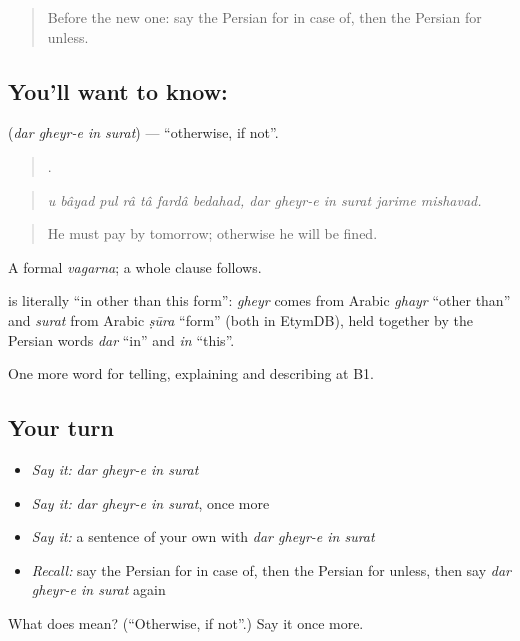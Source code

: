 \label{lesson:FA-C390-dar-gheyr-e-in-surat}



\begin{quote}
Before the new one: say the Persian for in case of, then the Persian for unless.
\end{quote}

\subsection*{You'll want to know:    }
\textbf{   } (\emph{dar gheyr-e in surat}) — \textquotedblleft{}otherwise, if not\textquotedblright{}.

\begin{quote}
            .
\end{quote}

\begin{quote}
\emph{u bâyad pul râ tâ fardâ bedahad, dar gheyr-e in surat jarime mishavad.}
\end{quote}

\begin{quote}
He must pay by tomorrow; otherwise he will be fined.
\end{quote}

A formal \emph{vagarna}; a whole clause follows.

\begin{cousinweb}
\textbf{   } is literally \textquotedblleft{}in other than this form\textquotedblright{}: \emph{gheyr} comes from Arabic \emph{ghayr} \textquotedblleft{}other than\textquotedblright{} and \emph{surat} from Arabic \emph{ṣūra} \textquotedblleft{}form\textquotedblright{} (both in EtymDB), held together by the Persian words \emph{dar} \textquotedblleft{}in\textquotedblright{} and \emph{in} \textquotedblleft{}this\textquotedblright{}.
\end{cousinweb}

\begin{grammarlens}[title={What you've built}]
One more word for telling, explaining and describing at B1.
\end{grammarlens}

\subsection*{Your turn}
\begin{itemize}
\raggedright
  \item \emph{Say it:} \emph{dar gheyr-e in surat}
  \item \emph{Say it:} \emph{dar gheyr-e in surat}, once more
  \item \emph{Say it:} a sentence of your own with \emph{dar gheyr-e in surat}
  \item \emph{Recall:} say the Persian for in case of, then the Persian for unless, then say \emph{dar gheyr-e in surat} again
\end{itemize}

\begin{tcolorbox}[breakable,colback=teal!4,colframe=teal!35!black,title={Before you move on}]
What does     mean? (\textquotedblleft{}Otherwise, if not\textquotedblright{}.) Say it once more.
\end{tcolorbox}
